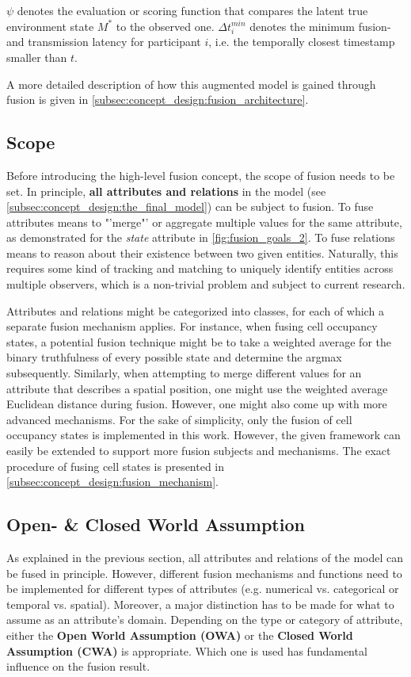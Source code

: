 $\psi$ denotes the evaluation or scoring function that compares the latent true environment state $M^*$ to the observed one. $\Delta t^{min}_i$ denotes the minimum fusion- and transmission latency for participant $i$, i.e. the temporally closest timestamp smaller than $t$. 

A more detailed description of how this augmented model is gained through fusion is given in \cref{subsec:concept_design:fusion_architecture}.

\subsection{Scope}
\label{subsec:concept_design:scope}
Before introducing the high-level fusion concept, the scope of fusion needs to be set. In principle, \textbf{all attributes and relations} in the model (see \cref{subsec:concept_design:the_final_model}) can be subject to fusion. To fuse attributes means to "'merge"' or aggregate multiple values for the same attribute, as demonstrated for the \textit{state} attribute in \cref{fig:fusion_goals_2}. To fuse relations means to reason about their existence between two given entities. Naturally, this requires some kind of tracking and matching to uniquely identify entities across multiple observers, which is a non-trivial problem and subject to current research.

Attributes and relations might be categorized into classes, for each of which a separate fusion mechanism applies. For instance, when fusing cell occupancy states, a potential fusion technique might be to take a weighted average for the binary truthfulness of every possible state and determine the argmax subsequently. Similarly, when attempting to merge different values for an attribute that describes a spatial position, one might use the weighted average Euclidean distance during fusion. However, one might also come up with more advanced mechanisms. For the sake of simplicity, only the fusion of cell occupancy states is implemented in this work. However, the given framework can easily be extended to support more fusion subjects and mechanisms. The exact procedure of fusing cell states is presented in \cref{subsec:concept_design:fusion_mechanism}.

\subsection{Open- \& Closed World Assumption}
\label{subsec:concept_design:fusion_open_closed_world_assumption}
As explained in the previous section, all attributes and relations of the model can be fused in principle. However, different fusion mechanisms and functions need to be implemented for different types of attributes (e.g. numerical vs. categorical or temporal vs. spatial). Moreover, a major distinction has to be made for what to assume as an attribute's domain. Depending on the type or category of attribute, either the  \textbf{Open World Assumption (OWA)} or the \textbf{Closed World Assumption (CWA)} is appropriate. Which one is used has fundamental influence on the fusion result.

